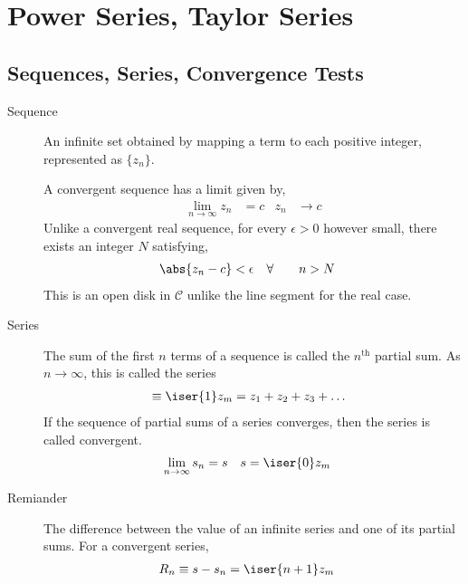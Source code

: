 \chapter{Power Series, Taylor Series}

\section{Sequences, Series, Convergence Tests}

\begin{description}
    \item[Sequence] An infinite set obtained by mapping a term to each positive integer,
        represented as $ \{z_n\} $. \par
        A convergent sequence has a limit given by,
        \begin{align}
            \lim_{n \to \infty} z_n & = c   &
            z_n                     & \to c
        \end{align}
        Unlike a convergent real sequence, for every $ \epsilon > 0 $ however small,
        there exists an integer $ N $ satisfying,
        \begin{align}
            \abs{z_n - c}    & < \epsilon &
            \forall \qquad n & > N
        \end{align}
        This is an open disk in $ \mathcal{C} $ unlike the line segment for the real case.

    \item[Series] The sum of the first $ n $ terms of a sequence is called the
        $ n^{\text{th}} $ partial sum. As $ n \to \infty $, this is called the
        series
        \begin{align}
            [z_m] & \equiv \iser{1} z_m = z_1 + z_2 + z_3 + \dots
        \end{align}
        If the sequence of partial sums of a series converges, then the series is
        called convergent.
        \begin{align}
            \lim_{n \to \infty}s_n & = s            &
            s                      & = \iser{0} z_m
        \end{align}

    \item[Remiander] The difference between the value of an infinite series and one
        of its partial sums. For a convergent series,
        \begin{align}
            R_n & \equiv s - s_n = \iser{n+1} z_m
        \end{align}


\end{description}
